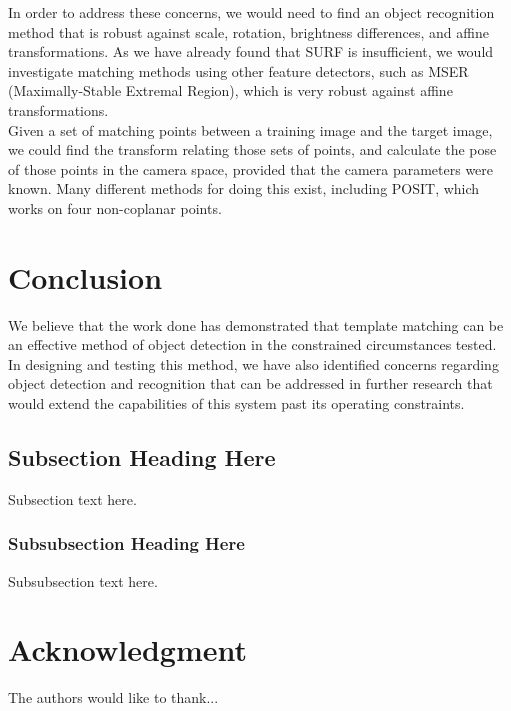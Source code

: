 \documentclass[conference]{IEEEtran}
\begin{document}
In order to address these concerns, we would need to find an object recognition method that is robust against scale, rotation, brightness differences, and affine transformations.  As we have already found that SURF is insufficient, we would investigate matching methods using other feature detectors, such as MSER (Maximally-Stable Extremal Region), which is very robust against affine transformations.\\

Given a set of matching points between a training image and the target image, we could find the transform relating those sets of points, and calculate the pose of those points in the camera space, provided that the camera parameters were known.  Many different methods for doing this exist, including POSIT, which works on four non-coplanar points.


\section{Conclusion}
We believe that the work done has demonstrated that template matching can be an effective method of object detection in the constrained circumstances tested.  In designing and testing this method, we have also identified concerns regarding object detection and recognition that can be addressed in further research that would extend the capabilities of this system past its operating constraints.

\subsection{Subsection Heading Here}
Subsection text here.


\subsubsection{Subsubsection Heading Here}
Subsubsection text here.






\section*{Acknowledgment}


The authors would like to thank...





\end{document}
